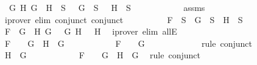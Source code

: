 \begin{isabellebody}
\ {\isachardoublequoteopen}{\isasymforall}\ G\ H{\isachardot}\ \isactrlbold {\isasymnot}{\isacharparenleft}G\ \isactrlbold {\isasymand}\ H{\isacharparenright}\ {\isasymin}\ S\ {\isasymlongrightarrow}\ \isactrlbold {\isasymnot}\ G\ {\isasymin}\ S\ {\isasymor}\ \isactrlbold {\isasymnot}\ H\ {\isasymin}\ S{\isachardoublequoteclose}\isanewline
\ \ \ \ \ \ \ \ \ \ \isamarkupfalse%
\ assms\ \isamarkupfalse%
\ {\isacharparenleft}iprover\ elim{\isacharcolon}\ conjunct{}\ conjunct{}{\isacharparenright}\isanewline
\ \ \ \ \ \ \ \ \isamarkupfalse%
\ {\isachardoublequoteopen}F\ {\isasymin}\ S\ {\isasymlongrightarrow}\ G\ {\isasymin}\ S\ {\isasymor}\ H\ {\isasymin}\ S{\isachardoublequoteclose}\isanewline
\ \ \ \ \ \ \ \ \ \ \isamarkupfalse%
\ {\isacartoucheopen}F\ {\isacharequal}\ \isactrlbold {\isasymnot}{\isacharparenleft}G{}\ \isactrlbold {\isasymand}\ H{}{\isacharparenright}{\isacartoucheclose}\ {\isacartoucheopen}G\ {\isacharequal}\ \isactrlbold {\isasymnot}\ G{}{\isacartoucheclose}\ {\isacartoucheopen}H\ {\isacharequal}\ \isactrlbold {\isasymnot}\ H{}{\isacartoucheclose}\ \isamarkupfalse%
\ {\isacharparenleft}iprover\ elim{\isacharcolon}\ allE{\isacharparenright}\isanewline
\ \ \ \ \ \ \isamarkupfalse%
\isanewline
\ \ \ \ \ \ \ \ \isamarkupfalse%
\ {\isachardoublequoteopen}F\ {\isacharequal}\ \isactrlbold {\isasymnot}\ {\isacharparenleft}\isactrlbold {\isasymnot}\ G{\isacharparenright}\ {\isasymand}\ H\ {\isacharequal}\ G{\isachardoublequoteclose}\isanewline
\ \ \ \ \ \ \ \ \isamarkupfalse%
\ \isamarkupfalse%
\ {\isachardoublequoteopen}F\ {\isacharequal}\ \isactrlbold {\isasymnot}\ {\isacharparenleft}\isactrlbold {\isasymnot}\ G{\isacharparenright}{\isachardoublequoteclose}\ \isanewline
\ \ \ \ \ \ \ \ \ \ \isamarkupfalse%
\ {\isacharparenleft}rule\ conjunct{}{\isacharparenright}\isanewline
\ \ \ \ \ \ \ \ \isamarkupfalse%
\ {\isachardoublequoteopen}H\ {\isacharequal}\ G{\isachardoublequoteclose}\isanewline
\ \ \ \ \ \ \ \ \ \ \isamarkupfalse%
\ {\isacartoucheopen}F\ {\isacharequal}\ \isactrlbold {\isasymnot}\ {\isacharparenleft}\isactrlbold {\isasymnot}\ G{\isacharparenright}\ {\isasymand}\ H\ {\isacharequal}\ G{\isacartoucheclose}\ \isamarkupfalse%
\ {\isacharparenleft}rule\ conjunct{}{\isacharparenright}\isanewline
\ \ \ \ \ \ \ \ \isamarkupfalse%

\end{isabellebody}
